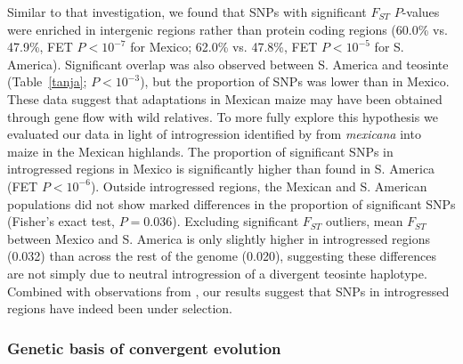{{Similar to that investigation, we found that SNPs with significant $F_{ST}$ $P$-values were enriched in intergenic regions rather than protein coding regions (60.0\% vs. 47.9\%, FET $P < 10^{-7}$ for Mexico; 62.0\% vs. 47.8\%, FET $P<10^{-5}$ for S. America). 
Significant overlap was also observed between S. America and teosinte (Table~\ref{tanja}; $P<10^{-3}$), but the proportion of SNPs was lower than in Mexico.
These data suggest that adaptations in Mexican maize may have been obtained through gene flow with wild relatives.  To more fully explore this hypothesis we evaluated our data in light of introgression identified by \citet{Profford_2013} from \textit{mexicana} into maize in the Mexican highlands.  
The proportion of significant SNPs in introgressed regions in Mexico is significantly higher than found in S. America (FET $P<10^{-6}$).
Outside introgressed regions, the Mexican and S. American populations did not show marked differences in the proportion of significant SNPs (Fisher's exact test, $P=0.036$).  Excluding  significant $F_{ST}$ outliers, mean $F_{ST}$ between Mexico and S. America is only slightly higher in introgressed regions (0.032) than across the rest of the genome (0.020), suggesting these differences are not simply due to neutral introgression of a divergent teosinte haplotype.  Combined with observations from \citep{Profford_2013}, our results suggest that SNPs in introgressed regions have indeed been under selection. 


\subsubsection{Genetic basis of convergent evolution}


}}

